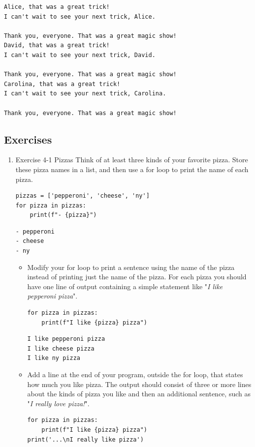\documentclass[10pt]{book}
\begin{document}
\label{org740ec7d}
\begin{verbatim}
Alice, that was a great trick!
I can't wait to see your next trick, Alice.

Thank you, everyone. That was a great magic show!
David, that was a great trick!
I can't wait to see your next trick, David.

Thank you, everyone. That was a great magic show!
Carolina, that was a great trick!
I can't wait to see your next trick, Carolina.

Thank you, everyone. That was a great magic show!
\end{verbatim}
\subsection{Exercises}
\label{sec:org9a7c55a}
\begin{enumerate}
\item Exercise 4-1 Pizzas
\label{sec:org8bf0860}
Think of at least three kinds of your favorite pizza. Store these pizza names in a list, and then use a for loop to print the name of each pizza.
\begin{verbatim}
pizzas = ['pepperoni', 'cheese', 'ny']
for pizza in pizzas:
    print(f"- {pizza}")
\end{verbatim}

\label{orgf20e0b8}
\begin{verbatim}
- pepperoni
- cheese
- ny
\end{verbatim}

\begin{itemize}
\item Modify your for loop to print a sentence using the name of the pizza instead of printing just the name of the pizza. For each pizza you should have one line of output containing a simple statement like "\emph{I like pepperoni pizza}".
\begin{verbatim}
for pizza in pizzas:
    print(f"I like {pizza} pizza")
\end{verbatim}

\label{org07d4526}
\begin{verbatim}
I like pepperoni pizza
I like cheese pizza
I like ny pizza
\end{verbatim}

\item Add a line at the end of your program, outside the for loop, that states how much you like pizza. The output should consist of three or more lines about the kinds of pizza you like and then an additional sentence, such as "\emph{I really love pizza!}".
\begin{verbatim}
for pizza in pizzas:
    print(f"I like {pizza} pizza")
print('...\nI really like pizza')
\end{verbatim}


\end{itemize}
\end{enumerate}
\end{document}
